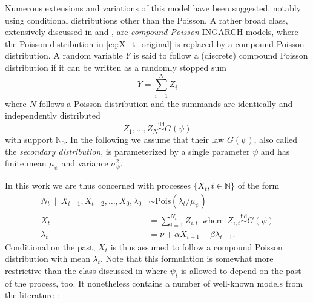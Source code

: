 \documentclass[review]{elsarticle}
\begin{document}
Numerous extensions and variations of this model have been suggested, notably using conditional distributions other than the Poisson. A rather broad class, extensively discussed in \cite{Goncalves2015} and \cite{Silva2016}, are \textit{compound Poisson} INGARCH models, where the Poisson distribution in \eqref{eq:X_t_original} is replaced by a compound Poisson distribution. A random variable $Y$ is said to follow a (discrete) compound Poisson distribution \cite[Chapter 3]{Feller1968} if it can be written as a randomly stopped sum 
$$
Y = \sum_{i = 1}^N Z_i
$$
where $N$ follows a Poisson distribution and the summands are identically and independently distributed
$$
Z_1, \dots, Z_N \stackrel{\text{iid}}{\sim} G(\psi)
$$
with support $\mathbb{N}_0$. In the following we assume that their law $G(\psi)$, also called the \textit{secondary distribution}, is parameterized by a single parameter $\psi$ and has finite mean $\mu_\psi$ and variance $\sigma^2_\psi$.

In this work we are thus concerned with processes $\{X_t, t \in \mathbb{N}\}$ of the form %
\begin{align}
N_t \ \mid \ X_{t - 1}, X_{t - 2}, \dots, X_0, \lambda_0 & \sim \text{Pois}(\lambda_t/\mu_\psi) \label{eq:X_CP_original}\\
X_t & = \sum_{i = 1}^{N_t} Z_{i, t} \ \ \text{where} \ \  Z_{i, t} \stackrel{\text{iid}}{\sim} G(\psi)\label{secondary_distr_original}\\
\lambda_t & = \nu + \alpha X_{t - 1} + \beta \lambda_{t - 1}.\label{eq:lambda_CP_original}
\end{align}
Conditional on the past, $X_t$ is thus assumed to follow a compound Poisson distribution with mean $\lambda_t$. Note that this formulation is somewhat more restrictive than the class discussed in \citep{Goncalves2015} where $\psi_t$ is allowed to depend on the past of the process, too. It nonetheless contains a number of well-known models from the literature \cite[Observation 2]{Goncalves2015}:
\end{document}
